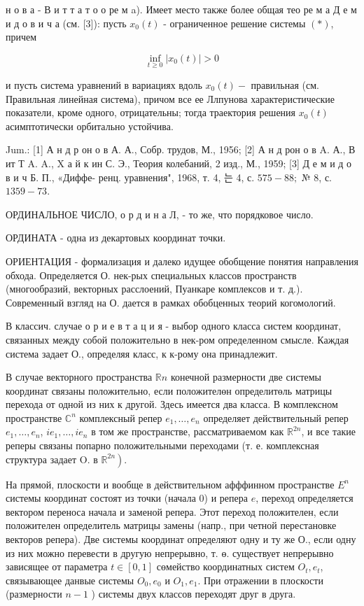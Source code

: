 \documentclass[10pt]{article}
\begin{document}
н о в а - В и т т а т о о ре м a). Имеет место также более общая тео ре м а Д е м и д о в и ч а (см. [3]): пусть $x_{0}(t)$ - ограниченное решение системы $(*)$, причем

\[
\inf _{t \geqslant 0}\left|x_{0}(t)\right|>0
\]

и пусть система уравнений в вариациях вдоль $x_{0}(t)-$ правильная (см. Правильная линейная система), причом все ее Ллпунова характеристические показатели, кроме одного, отрицательны; тогда траектория решения $x_{0}(t)$ асимптотически орбитально устойчива.

Jum.: [1] А н д р он о в А. А., Собр. трудов, М., 1956; [2] А н д рон о в A. А., В ит Т A. A., X а й к ин С. Э., Теория колебаний, 2 изд., М., 1959; [3] Д е м и д о в и ч Б. П., «Диффе-
ренц. уравнения", 1968, т. 4, 는 4, с. $575-88 ;$ № 8, с. $1359-73$.

ОРДИНАЛЬНОЕ ЧИСЛО, о р д и н а Л, - то же, что порядковое число.

ОРДИНАТА - одна из декартовых координат точки.

ОРИЕНТАЦИЯ - формализация и далеко идущее обобщение понятия направления обхода. Определяется О. нек-рых специальных классов пространств (многообразий, векторных расслоений, Пуанкаре комплексов и т. д.). Современный взгляд на О. дается в рамках обобценных теорий когомологий.

В классич. случае о р и е в т а ц и я - выбор одного класса систем координат, связанных между собой положительно в нек-ром определенном смысле. Каждая система задает О., определяя класс, к к-рому она принадлежит.

В случае векторного пространства $\mathbb{R} n$ конечной размерности две системы координат связаны положительно, если положителөн определитөль матрицы перехода от одной из них к другой. Здесь имеется два класса. В комплексном пространстве $\mathbb{C}^{n}$ комплексный репер $e_{1}, \ldots, e_{n}$ определяет действительный репер $e_{1}, \ldots, e_{n}$, $i e_{1}, \ldots, i e_{n}$ в том же пространстве, рассматриваемом как $\mathbb{R}^{2 n}$, и все такие реперы связаны попарно положительными переходами (т. е. комплексная структура задает O. в $\left.\mathbb{R}^{2 n}\right)$.

На прямой, плоскости и вообще в действительном афффинном пространстве $E^{n}$ системы координат состоят из точки (начала 0) и репера $e$, переход определяется вектором переноса начала и заменой репера. Этот переход положителен, если положителен определитель матрицы замены (напр., при четной перестановке векторов репера). Две системы координат определяют одну и ту же О., если одну из них можно перевести в другую непрерывно, т. ө. существует непрерывно зависящее от параметра $t \in[0,1]$ сөмейство координатных систем $O_{t}, e_{t}$, связывающее данвые системы $O_{0}, e_{0}$ и $O_{1}, e_{1}$. При отражении в плоскости (размерности $n-1$ ) системы двух классов переходят друг в друга.
\end{document}
